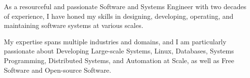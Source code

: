 
\begin{cvparagraph}

As a resourceful and passionate Software and Systems Engineer with two decades of experience, I have honed my 
skills in designing, developing, operating, and maintaining software systems at various scales. 

My expertise spans multiple industries and domains, and I am particularly passionate about Developing 
Large-scale Systems, Linux, Databases, Systems Programming, Distributed Systems, and Automation at Scale, as 
well as Free Software and Open-source Software.
\end{cvparagraph}
